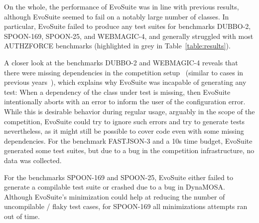 \documentclass[sigconf,table]{acmart}
\newcommand{\EVOSUITE}{{\sc EvoSuite}\xspace}
\begin{document}


On the whole, the performance of \EVOSUITE was in line with previous
results, although \EVOSUITE seemed to fail on a notably large number
of classes. In particular, \EVOSUITE failed to produce any test
suites for benchmarks DUBBO-2, SPOON-169, SPOON-25, and WEBMAGIC-4,
and generally struggled with most AUTHZFORCE benchmarks (highlighted
in grey in Table~\ref{table:results}).

A closer look at the benchmarks DUBBO-2 and WEBMAGIC-4 reveals that
there were missing dependencies in the competition
setup~\cite{sbst19competition} (similar to cases in previous
years~\cite{evosuiteAtSbst2018}), which explains why \EVOSUITE was
incapable of generating any test: When a dependency of the class
under test is missing, then \EVOSUITE intentionally aborts with an
error to inform the user of the configuration error. While this is
desirable behavior during regular usage, arguably in the scope of the
competition, \EVOSUITE could try to ignore such errors and try to
generate tests nevertheless, as it might still be possible to cover
code even with some missing dependencies. For the benchmark
FASTJSON-3 and a 10s time budget, \EVOSUITE generated some test
suites, but due to a bug in the
competition infrastructure, no data was collected. %

For the benchmarks SPOON-169 and SPOON-25, \EVOSUITE either failed to generate
a compilable test suite or crashed due to a bug in DynaMOSA. Although \EVOSUITE's
minimization could help at reducing the number of uncompilable / flaky test cases,
for SPOON-169 all minimizations attempts ran out of time.
\end{document}
